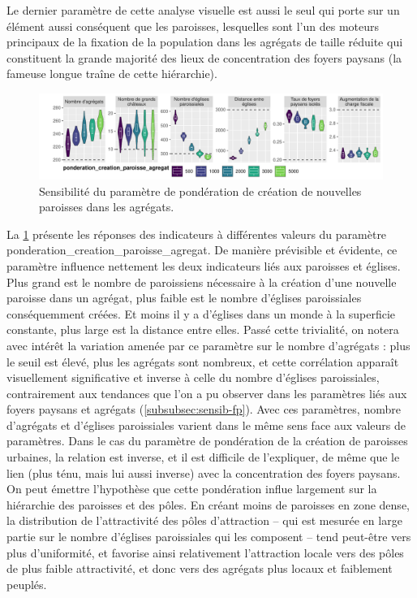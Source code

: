 Le dernier paramètre de cette analyse visuelle est aussi le seul qui porte sur un élément aussi conséquent que les paroisses, lesquelles sont l'un des moteurs principaux de la fixation de la population dans les agrégats de taille réduite qui constituent la grande majorité des lieux de concentration des foyers paysans (la fameuse \og longue traîne\fg{} de cette hiérarchie).

\begin{figure}[H]
	\centering
	\includegraphics[width=\linewidth]{img/sensib/sensibilite_ponderation_creation_paroisse_agregat.pdf}
	\caption{Sensibilité du paramètre de pondération de création de nouvelles paroisses dans les agrégats.}
	\label{fig:sensib-paroisses}
\end{figure}

La \cref{fig:sensib-paroisses} présente les réponses des indicateurs à différentes valeurs du paramètre \textsf{ponderation\_creation\_paroisse\_agregat}.
De manière prévisible et évidente, ce paramètre influence nettement les deux indicateurs liés aux paroisses et églises.
Plus grand est le nombre de paroissiens nécessaire à la création d'une nouvelle paroisse dans un agrégat, plus faible est le nombre d'églises paroissiales conséquemment créées.
Et moins il y a d'églises dans un monde à la superficie constante, plus large est la distance entre elles.
Passé cette trivialité, on notera avec intérêt la variation amenée par ce paramètre sur le nombre d'agrégats : plus le seuil est élevé, plus les agrégats sont nombreux, et cette corrélation apparaît visuellement significative et inverse à celle du nombre d'églises paroissiales, contrairement aux tendances que l'on a pu observer dans les paramètres liés aux foyers paysans et agrégats (\cref{subsubsec:sensib-fp}).
Avec ces paramètres, nombre d'agrégats et d'églises paroissiales varient dans le même sens face aux valeurs de paramètres.
Dans le cas du paramètre de pondération de la création de paroisses \og urbaines\fg{}, la relation est inverse, et il est difficile de l'expliquer, de même que le lien (plus ténu, mais lui aussi inverse) avec la concentration des foyers paysans.
On peut émettre l'hypothèse que cette pondération influe largement sur la hiérarchie des paroisses et des pôles.
En créant moins de paroisses en zone dense, la distribution de l'attractivité des pôles d'attraction -- qui est mesurée en large partie sur le nombre d'églises paroissiales qui les composent -- tend peut-être vers plus d'uniformité, et favorise ainsi relativement l'attraction locale vers des pôles de plus faible attractivité, et donc vers des agrégats plus locaux et faiblement peuplés.




